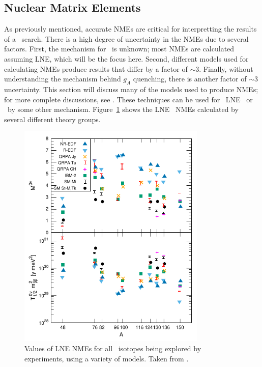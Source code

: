 \documentclass[/main.tex]{subfiles}
\begin{document}
\subsection{Nuclear Matrix Elements} \label{sec:NMEmethods}
As previously mentioned, accurate NMEs are critical for interpretting the results of a \znbb\ search.
There is a high degree of uncertainty in the NMEs due to several factors.
First, the mechanism for \znbb\ is unknown; most NMEs are calculated assuming LNE, which will be the focus here.
Second, different models used for calculating NMEs produce results that differ by a factor of ${\sim}3$.
Finally, without understanding the mechanism behind $g_A$ quenching, there is another factor of ${\sim}3$ uncertainty.
This section will discuss many of the models used to produce NMEs; for more complete discussions, see \cite{Avignone2008, Engel2017}.
These techniques can be used for \tnbb\, LNE \znbb\ or \znbb\ by some other mechanism.
Figure~\ref{fig:horribleplot} shows the LNE \znbb\ NMEs calculated by several different theory groups.
\begin{figure}[p]
  \centering
  \includegraphics[width=0.8\textwidth]{horribleplot}
  \caption[\znbb\ Nuclear Matrix Element Calculations]{\label{fig:horribleplot}
    Values of LNE NMEs for all \znbb\ isotopes being explored by experiments, using a variety of models. Taken from \cite{Engel2017}.
  }
\end{figure}
\end{document}
